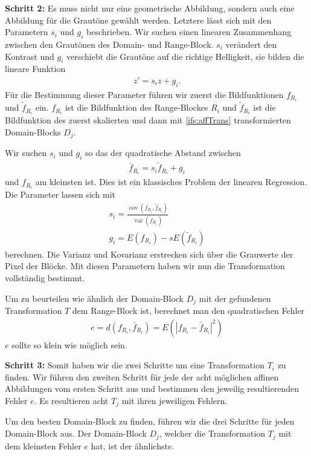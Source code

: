 \textbf{Schritt 2: }Es muss nicht nur eine geometrische Abbildung, sondern auch eine Abbildung für die Grautöne gewählt werden. Letztere lässt sich mit den Parametern $s_i$ und $g_i$ beschrieben.
Wir suchen einen linearen Zusammenhang zwischen den Grautönen des Domain- und Range-Block. $s_i$ verändert den Kontrast und $g_i$ verschiebt die Grautöne auf die richtige Helligkeit, sie bilden die lineare Funktion
%
\begin{align*}
	z' = s_i z + g_i.
\end{align*}
Für die Bestimmung dieser Parameter führen wir zuerst die Bildfunktionen $f_{R_i}$ und $\tilde{f}_{R_i}$ ein.
$f_{R_i}$ ist die Bildfunktion des Range-Blockes $R_i$ und $\tilde{f}_{R_i}$ ist die Bildfunktion des zuerst skalierten und dann mit \eqref{ifs:affTrans} transformierten Domain-Blocks $D_j$.

Wir suchen $s_i$ und $g_i$ so das der quadratische Abstand zwischen 
\begin{align*}
	\bar{f}_{R_i} = s_i \tilde{f}_{R_i} + g_i
\end{align*}
und $f_{R_i}$ am kleinsten ist.
Dies ist ein klassisches Problem der linearen Regression. Die Parameter lassen sich mit
%
%
\begin{align*}	
	s_i = \frac{\operatorname{cov}(f_{R_i}, \tilde{f}_{R_i})}{\operatorname{var}(\tilde{f}_{R_i})} \\
	g_i = E(f_{R_i}) - s E(\tilde{f}_{R_i})
\end{align*}
berechnen.
Die Varianz und Kovarianz erstrecken sich über die Grauwerte der Pixel der Blöcke.
Mit diesen Parametern haben wir nun die Transformation vollständig bestimmt.

Um zu beurteilen wie ähnlich der Domain-Block $D_j$ mit der gefundenen Transformation $T$ dem Range-Block ist, berechnet man den quadratischen Fehler
\begin{align*}
	e = d(f_{R_i}, \bar{f}_{R_i})
=
E(|f_{R_i} - \bar{f}_{R_i}|^2)
\end{align*}
$e$ sollte so klein wie möglich sein.

\textbf{Schritt 3: }
Somit haben wir die zwei Schritte um eine Transformation $T_i$ zu finden.
Wir führen den zweiten Schritt für jede der acht möglichen affinen Abbildungen vom ersten Schritt aus und bestimmen den jeweilig resultierenden Fehler $e$.
Es resultieren acht $T_j$ mit ihren jeweiligen Fehlern.

Um den besten Domain-Block zu finden, führen wir die drei Schritte für jeden Domain-Block aus.
Der Domain-Block $D_j$, welcher die Transformation $T_j$ mit dem kleinsten Fehler $e$ hat, ist der ähnlichste.

